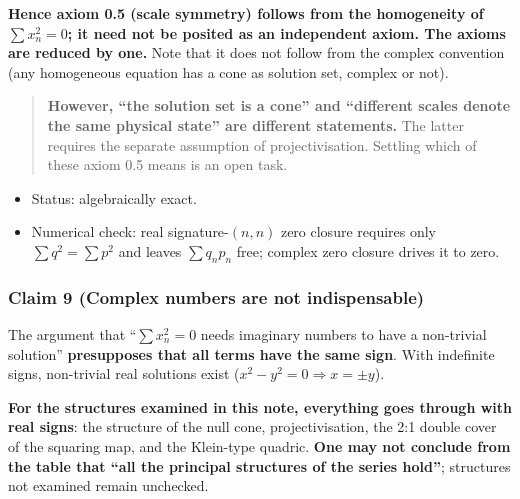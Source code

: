 \documentclass[
  10pt,
]{article}
\providecommand{\tightlist}{%
  \setlength{\itemsep}{0pt}\setlength{\parskip}{0pt}}
\begin{document}
\textbf{Hence axiom 0.5 (scale symmetry) follows from the homogeneity of
\(\sum x_n^2 = 0\); it need not be posited as an independent axiom. The
axioms are reduced by one.} Note that it does not follow from the
complex convention (any homogeneous equation has a cone as solution set,
complex or not).

\begin{quote}
\textbf{However, ``the solution set is a cone'' and ``different scales
denote the same physical state'' are different statements.} The latter
requires the separate assumption of projectivisation. Settling which of
these axiom 0.5 means is an open task.
\end{quote}

\begin{itemize}
\tightlist
\item
  Status: algebraically exact.
\item
  Numerical check: real signature-\((n,n)\) zero closure requires only
  \(\sum q^2 = \sum p^2\) and leaves \(\sum q_np_n\) free; complex zero
  closure drives it to zero.
\end{itemize}

\subsubsection{Claim 9 (Complex numbers are not
indispensable)}\label{claim-9-complex-numbers-are-not-indispensable}

The argument that ``\(\sum x_n^2=0\) needs imaginary numbers to have a
non-trivial solution'' \textbf{presupposes that all terms have the same
sign}. With indefinite signs, non-trivial real solutions exist
(\(x^2-y^2=0 \Rightarrow x=\pm y\)).

\textbf{For the structures examined in this note, everything goes
through with real signs}: the structure of the null cone,
projectivisation, the 2:1 double cover of the squaring map, and the
Klein-type quadric. \textbf{One may not conclude from the table that
``all the principal structures of the series hold''}; structures not
examined remain unchecked.
\end{document}
